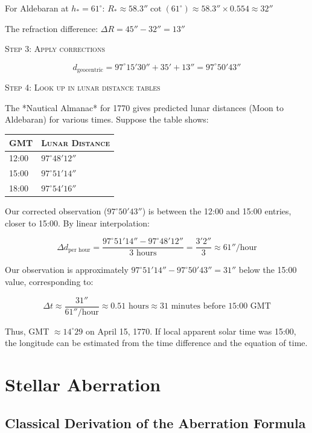 For Aldebaran at $h_* = 61^{\circ}$: $R_* \approx 58.3'' \cot(61^{\circ}) \approx 58.3'' \times 0.554 \approx 32''$

The refraction difference: $\Delta R = 45'' - 32'' = 13''$

\textsc{Step 3: Apply corrections}

\[
  d_{\text{geocentric}} = 97^{\circ} 15' 30'' + 35' + 13'' = 97^{\circ} 50' 43''
\]

\textsc{Step 4: Look up in lunar distance tables}

The *Nautical Almanac* for 1770 gives predicted lunar distances (Moon to Aldebaran) for various times. Suppose the table shows:

\begin{center}
\begin{tabular}{ll}
\hline
\textsc{GMT} & \textsc{Lunar Distance} \\
\hline
12:00 & $97^{\circ} 48' 12''$ \\
15:00 & $97^{\circ} 51' 14''$ \\
18:00 & $97^{\circ} 54' 16''$ \\
\hline
\end{tabular}
\end{center}

Our corrected observation ($97^{\circ} 50' 43''$) is between the 12:00 and 15:00 entries, closer to 15:00. By linear interpolation:

\[
  \Delta d_{\text{per hour}} = \frac{97^{\circ} 51' 14'' - 97^{\circ} 48' 12''}{3 \text{ hours}} = \frac{3' 2''}{3} \approx 61''/ \text{hour}
\]

Our observation is approximately $97^{\circ} 51' 14'' - 97^{\circ} 50' 43'' = 31''$ below the 15:00 value, corresponding to:

\[
  \Delta t \approx \frac{31''}{61'' / \text{hour}} \approx 0.51 \text{ hours} \approx 31 \text{ minutes before 15:00 GMT}
\]

Thus, GMT $\approx 14^{\circ}29$ on April 15, 1770. If local apparent solar time was 15:00, the longitude can be estimated from the time difference and the equation of time.

\section{Stellar Aberration}

\subsection*{Classical Derivation of the Aberration Formula}

